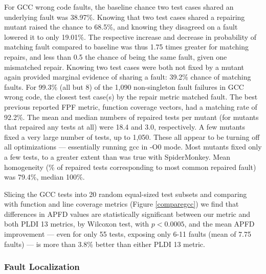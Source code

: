 For GCC wrong code faults, the baseline chance two test cases shared an underlying fault was 38.97\%.  Knowing that two test cases shared a repairing mutant raised the chance to 68.5\%, and knowing they disagreed on a fault lowered it to only 19.01\%.  The respective increase and decrease in probability of matching fault compared to baseline was thus 1.75 times greater for matching repairs, and less than 0.5 the chance of being the same fault, given one mismatched repair.  Knowing two test cases were both not fixed by a mutant again provided marginal evidence of sharing a fault: 39.2\% chance of matching faults.
For 99.3\% (all but 8) of the 1,090 non-singleton fault failures in GCC wrong code, the closest test case(s) by the repair metric matched fault.  The best previous reported FPF metric, function coverage vectors, had a matching rate of 92.2\%.   The mean and median numbers of repaired tests per mutant (for mutants that repaired any tests at all) were 18.4 and 3.0, respectively.  A few mutants fixed a very large number of tests, up to 1,050.  These all appear to be turning off all optimizations --- essentially running gcc in -O0 mode.  Most mutants fixed only a few tests, to a greater extent than was true with SpiderMonkey.    Mean homogeneity (\% of repaired tests corresponding to most common repaired fault) was 79.4\%, median 100\%.

Slicing the GCC tests into 20 random equal-sized test subsets and comparing with function and line coverage metrics (Figure \ref{comparegcc}) we find that differences in APFD values are statistically significant between our metric and both PLDI 13 metrics, by Wilcoxon test, with $p < 0.0005$, and the mean APFD improvement --- even for only 55 tests, exposing only 6-11 faults (mean of 7.75 faults) --- is more than 3.8\% better than either PLDI 13 metric.


\subsubsection{Fault Localization}

